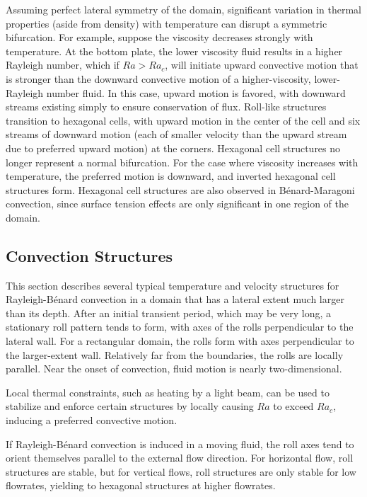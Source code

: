 \documentclass[10pt]{article}
\numberwithin{equation}{section} %
\begin{document}
Assuming perfect lateral symmetry of the domain, significant variation in thermal properties (aside from density) with temperature can disrupt a symmetric bifurcation. For example, suppose the viscosity decreases strongly with temperature. At the bottom plate, the lower viscosity fluid results in a higher Rayleigh number, which if \(Ra>Ra_c\), will initiate upward convective motion that is stronger than the downward convective motion of a higher-viscosity, lower-Rayleigh number fluid. In this case, upward motion is favored, with downward streams existing simply to ensure conservation of flux. Roll-like structures transition to hexagonal cells, with upward motion in the center of the cell and six streams of downward motion (each of smaller velocity than the upward stream due to preferred upward motion) at the corners. Hexagonal cell structures no longer represent a normal bifurcation. For the case where viscosity increases with temperature, the preferred motion is downward, and inverted hexagonal cell structures form. Hexagonal cell structures are also observed in B\'enard-Maragoni convection, since surface tension effects are only significant in one region of the domain.

\subsection{Convection Structures}
This section describes several typical temperature and velocity structures for Rayleigh-B\'enard convection in a domain that has a lateral extent much larger than its depth. After an initial transient period, which may be very long, a stationary roll pattern tends to form, with axes of the rolls perpendicular to the lateral wall. For a rectangular domain, the rolls form with axes perpendicular to the larger-extent wall. Relatively far from the boundaries, the rolls are locally parallel. Near the onset of convection, fluid motion is nearly two-dimensional. 

Local thermal constraints, such as heating by a light beam, can be used to stabilize and enforce certain structures by locally causing \(Ra\) to exceed \(Ra_c\), inducing a preferred convective motion. 

If Rayleigh-B\'enard convection is induced in a moving fluid, the roll axes tend to orient themselves parallel to the external flow direction. For horizontal flow, roll structures are stable, but for vertical flows, roll structures are only stable for low flowrates, yielding to hexagonal structures at higher flowrates.
\end{document}
